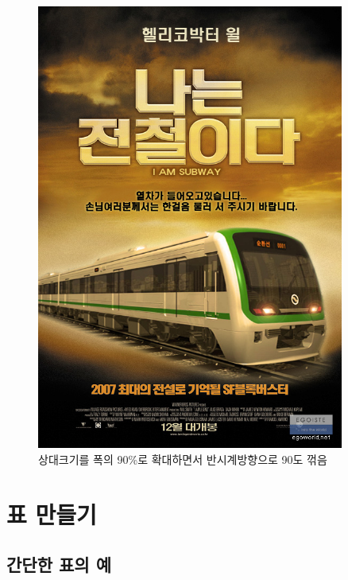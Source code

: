 \documentclass{beamer}
\begin{document}
\begin{figure}[h!]
  \begin{center}
    \includegraphics[angle=90, width=0.9\textwidth]{abcd}
  \caption{상대크기를 폭의 90\%로 확대하면서 반시계방향으로 90도 꺾음}
  \label{fig:iamsubway}
  \end{center}
\end{figure}

\section{표 만들기}

\subsection{간단한 표의 예}
\end{document}

